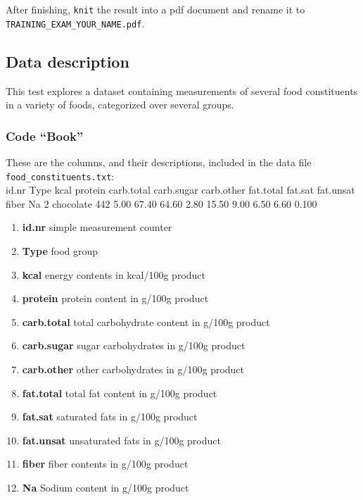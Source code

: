 \documentclass[
  a4paper]{article}
\providecommand{\tightlist}{%
  \setlength{\itemsep}{0pt}\setlength{\parskip}{0pt}}
\begin{document}
After finishing, \texttt{knit} the result into a pdf document and rename
it to \texttt{TRAINING\_EXAM\_YOUR\_NAME.pdf}.

\hypertarget{data-description}{%
\subsection{Data description}\label{data-description}}

This test explores a dataset containing measurements of several food
constituents in a variety of foods, categorized over several groups.

\hypertarget{code-book}{%
\subsubsection{Code ``Book''}\label{code-book}}

These are the columns, and their descriptions, included in the data file
\texttt{food\_constituents.txt}:\\
id.nr Type kcal protein carb.total carb.sugar carb.other fat.total
fat.sat fat.unsat fiber Na 2 chocolate 442 5.00 67.40 64.60 2.80 15.50
9.00 6.50 6.60 0.100

\begin{enumerate}
\def\labelenumi{\arabic{enumi}.}
\tightlist
\item
  \textbf{id.nr} simple measurement counter
\item
  \textbf{Type} food group
\item
  \textbf{kcal} energy contents in kcal/100g product
\item
  \textbf{protein} protein content in g/100g product
\item
  \textbf{carb.total} total carbohydrate content in g/100g product
\item
  \textbf{carb.sugar} sugar carbohydrates in g/100g product
\item
  \textbf{carb.other} other carbohydrates in g/100g product
\item
  \textbf{fat.total} total fat content in g/100g product
\item
  \textbf{fat.sat} saturated fats in g/100g product
\item
  \textbf{fat.unsat} unsaturated fats in g/100g product
\item
  \textbf{fiber} fiber contents in g/100g product
\item
  \textbf{Na} Sodium content in g/100g product
\end{enumerate}
\end{document}
